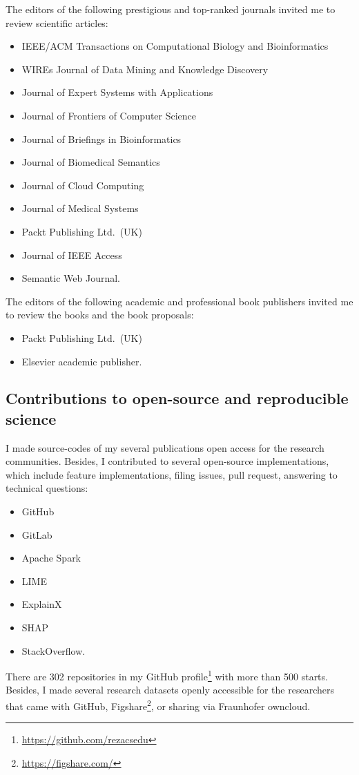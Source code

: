 \begin{appendices}
The editors of the following prestigious and top-ranked journals invited me to review scientific articles: 

\begin{itemize}[noitemsep]
    \item IEEE/ACM Transactions on Computational Biology and Bioinformatics
    \item WIREs Journal of Data Mining and Knowledge Discovery
    \item Journal of Expert Systems with Applications 
    \item Journal of Frontiers of Computer Science
    \item Journal of Briefings in Bioinformatics
    \item Journal of Biomedical Semantics
    \item Journal of Cloud Computing
    \item Journal of Medical Systems
    \item Packt Publishing Ltd.~(UK)
    \item Journal of IEEE Access 
    \item Semantic Web Journal.
\end{itemize}

The editors of the following academic and professional book publishers invited me to review the books and the book proposals: 

\begin{itemize}[noitemsep]
    \item Packt Publishing Ltd.~(UK)
    \item Elsevier academic publisher. 
\end{itemize}

\subsection*{Contributions to open-source and reproducible science %
}%
I made source-codes of my several publications open access for the research communities. Besides, I contributed to several open-source implementations, which include feature implementations, filing issues, pull request, answering to technical questions: 

\begin{itemize}[noitemsep]
    \item GitHub
    \item GitLab
    \item Apache Spark 
    \item LIME
    \item ExplainX
    \item SHAP
    \item StackOverflow.
\end{itemize}

There are 302 repositories in my GitHub profile\footnote{\url{https://github.com/rezacsedu}} with more than 500 starts. Besides, I made several research datasets openly accessible for the researchers that came with GitHub, Figshare\footnote{\url{https://figshare.com/}}, or sharing via Fraunhofer owncloud.

\end{appendices}